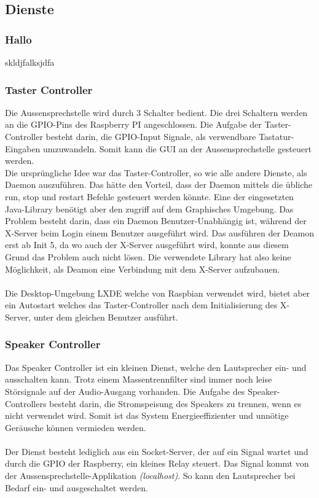 \subsection{Dienste}
\label{kap:dienste}

\subsubsection{Hallo}
skldjfalksjdfa



\subsubsection{Taster Controller}
Die Aussensprechstelle wird durch 3 Schalter bedient. Die drei Schaltern werden an die GPIO-Pins des Raspberry PI angeschlossen. Die Aufgabe der Taster-Controller besteht darin, die GPIO-Input Signale, als verwendbare Tastatur-Eingaben umzuwandeln. Somit kann die GUI an der Aussensprechstelle gesteuert werden.
\\
Die ursprüngliche Idee war das Taster-Controller, so wie alle andere Dienste, als Daemon auszuführen. Das hätte den Vorteil, dass der Daemon mittels die übliche run, stop und restart Befehle gesteuert werden könnte. Eine der eingesetzten Java-Library benötigt aber den zugriff auf dem Graphisches Umgebung. Das Problem besteht darin, dass ein Daemon Benutzer-Unabhängig ist, während der X-Server beim Login einem Benutzer ausgeführt wird. Das ausführen der Deamon erst ab Init 5, da wo auch der X-Server ausgeführt wird, konnte aus diesem Grund das Problem auch nicht lösen.
Die verwendete Library hat also keine Möglichkeit, als Deamon eine Verbindung mit dem X-Server aufzubauen.
\\\\
Die Desktop-Umgebung LXDE welche von Raspbian verwendet wird, bietet aber ein Autostart welches das Taster-Controller nach dem Initialisierung des X-Server, unter dem gleichen Benutzer ausführt.

\subsubsection{Speaker Controller}
Das Speaker Controller ist ein kleinen Dienst, welche den Lautsprecher ein- und ausschalten kann. Trotz einem Massentrennfilter sind immer noch leise Störsignale auf der Audio-Ausgang vorhanden.
Die Aufgabe des Speaker-Controllers besteht darin, die Stromspeisung des Speakers zu trennen, wenn es nicht verwendet wird. Somit ist das System Energieeffizienter und unnötige Geräusche können vermieden werden.
\\
\\
Der Dienst besteht lediglich aus ein Socket-Server, der auf ein Signal wartet und durch die GPIO der Raspberry, ein kleines Relay steuert.
Das Signal kommt von der Aussensprechstelle-Applikation \textit{(localhost)}. So kann den Lautsprecher bei Bedarf ein- und ausgeschaltet werden.

